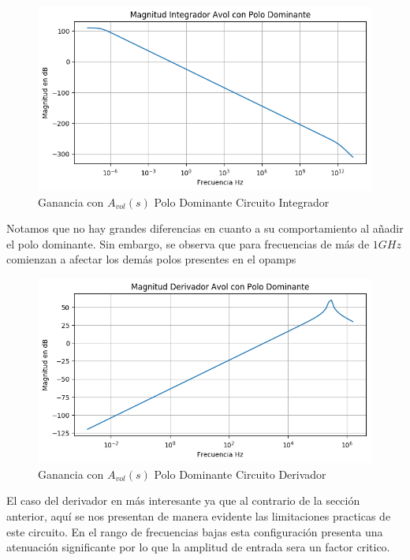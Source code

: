 \begin{figure}[H]
	\centering
	\includegraphics[width=\textwidth]{Ejercicio4/BODE-AVOLW-MAGNITUD-INTEGRADO}
	\caption{Ganancia con $A_{vol}(s)$ Polo Dominante Circuito Integrador}
\end{figure}
Notamos que no hay grandes diferencias en cuanto a su comportamiento al añadir el polo dominante. Sin embargo, se observa que para frecuencias de más de $1GHz$ comienzan a afectar los demás polos presentes en el opamps

\begin{figure}[H]
	\centering
	\includegraphics[width=\textwidth]{Ejercicio4/BODE-AVOLW-MAGNITUD-DERIVADOR}
	\caption{Ganancia con $A_{vol}(s)$ Polo Dominante Circuito Derivador}
\end{figure}
El caso del derivador en más interesante ya que al contrario de la sección anterior, aquí se nos presentan de manera evidente las limitaciones practicas de este circuito. 
En el rango de frecuencias bajas esta configuración presenta una atenuación significante por lo que la amplitud de entrada sera un factor critico. 


